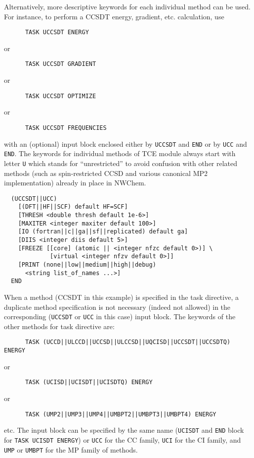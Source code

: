 Alternatively, more descriptive keywords for each individual method can be used.
For instance, to perform a CCSDT energy, gradient, etc. calculation, use
\begin{verbatim}
      TASK UCCSDT ENERGY
\end{verbatim}
or
\begin{verbatim}
      TASK UCCSDT GRADIENT
\end{verbatim}
or
\begin{verbatim}
      TASK UCCSDT OPTIMIZE
\end{verbatim}
or
\begin{verbatim}
      TASK UCCSDT FREQUENCIES
\end{verbatim}
with an (optional) input block enclosed either by \verb+UCCSDT+ and \verb+END+ or
by \verb+UCC+ and \verb+END+.  The keywords for individual methods of TCE module
always start with letter \verb+U+ which stands for ``unrestricted'' to avoid 
confusion with other related methods (such as spin-restricted CCSD and various 
canonical MP2 implementation) already in place in NWChem.
\begin{verbatim}
  (UCCSDT||UCC)
    [(DFT||HF||SCF) default HF=SCF]
    [THRESH <double thresh default 1e-6>]
    [MAXITER <integer maxiter default 100>]
    [IO (fortran||c||ga||sf||replicated) default ga]
    [DIIS <integer diis default 5>]
    [FREEZE [[core] (atomic || <integer nfzc default 0>)] \
             [virtual <integer nfzv default 0>]]
    [PRINT (none||low||medium||high||debug)
      <string list_of_names ...>]
  END
\end{verbatim}
When a method (CCSDT in this example) is specified in the task directive, 
a duplicate method specification
is not necessary (indeed not allowed) in the corresponding (\verb+UCCSDT+ or \verb+UCC+ in this case) 
input block.  The keywords of the other methods for task directive are:
\begin{verbatim}
      TASK (UCCD||ULCCD||UCCSD||ULCCSD||UQCISD||UCCSDT||UCCSDTQ) ENERGY
\end{verbatim}
or
\begin{verbatim}
      TASK (UCISD||UCISDT||UCISDTQ) ENERGY
\end{verbatim}
or
\begin{verbatim}
      TASK (UMP2||UMP3||UMP4||UMBPT2||UMBPT3||UMBPT4) ENERGY
\end{verbatim}
etc.  The input block can be specified by the same name (\verb+UCISDT+ and \verb+END+
block for \verb+TASK UCISDT ENERGY+) or \verb+UCC+ for the CC family, \verb+UCI+ for 
the CI family, and \verb+UMP+ or \verb+UMBPT+ for the MP family of methods.

